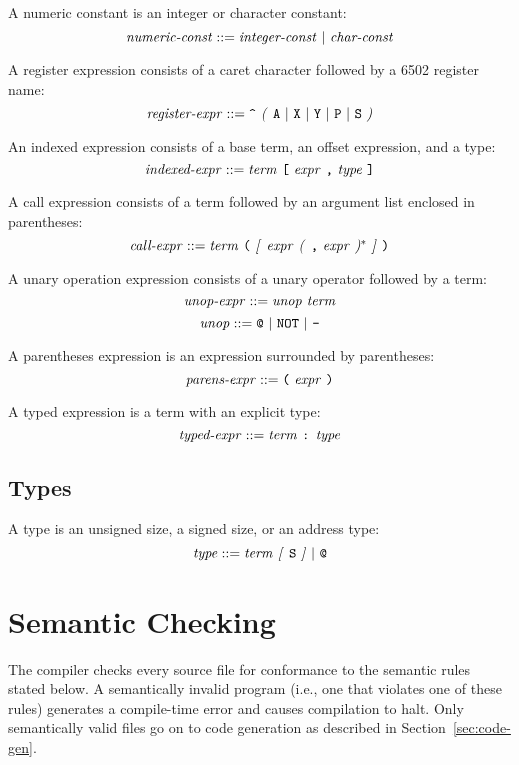 \documentclass[10pt]{article}
\begin{document}
  A numeric constant is an integer or
character constant:
%
$$\mbox{\textit{numeric-const}} ::= \mbox{\ensuremath{\mbox{\textit{integer-const}}} $|$
  \ensuremath{\mbox{\textit{char-const}}}}$$

 A register expression consists of a
caret character followed by a 6502 register name:
%
$$\mbox{\textit{register-expr}} ::= \mbox{\texttt{\textasciicircum} \textit{(} \texttt{A} $|$
    \texttt{X} $|$ \texttt{Y} $|$ \texttt{P} $|$ \texttt{S} \textit{)}}$$

 An indexed expression consists of a base
term, an offset expression, and a type:
%
$$\mbox{\textit{indexed-expr}} ::= \mbox{\ensuremath{\mbox{\textit{term}}} \texttt{[}
    \ensuremath{\mbox{\textit{expr}}} \texttt{,} \ensuremath{\mbox{\textit{type}}} \texttt{]}}$$

 A call expression consists of a term
followed by an argument list enclosed in parentheses:
%
$$\mbox{\textit{call-expr}} ::= \mbox{\ensuremath{\mbox{\textit{term}}} \texttt{(}
  \textit{[} \ensuremath{\mbox{\textit{expr}}} \textit{(} \texttt{,} \ensuremath{\mbox{\textit{expr}}} \textit{)}$^*$ \textit{]} \texttt{)}}$$

 A unary operation expression
consists of a unary operator followed by a term:
%
$$\mbox{\textit{unop-expr}} ::= \mbox{\ensuremath{\mbox{\textit{unop}}} \ensuremath{\mbox{\textit{term}}}}$$
%
$$\mbox{\textit{unop}} ::= \mbox{\texttt{@} $|$ \texttt{NOT} $|$ \texttt{-}}$$

 A parentheses expression is an
expression surrounded by parentheses:
%
$$\mbox{\textit{parens-expr}} ::= \mbox{\texttt{(} \ensuremath{\mbox{\textit{expr}}} \texttt{)}}$$

 A typed expression is a term with an
explicit type:
%
$$\mbox{\textit{typed-expr}} ::= \mbox{\ensuremath{\mbox{\textit{term}}} \texttt{:}
  \ensuremath{\mbox{\textit{type}}}}$$

\subsection{Types}
\label{sec:syntax:types}

A type is an unsigned size, a signed size, or an address type:
%
$$\mbox{\textit{type}} ::= \mbox{\ensuremath{\mbox{\textit{term}}} \textit{[} \texttt{S} \textit{]} $|$ \texttt{@}}$$

\section{Semantic Checking}
\label{sec:semantics}

The compiler checks every source file for conformance to the semantic
rules stated below.  A semantically invalid program (i.e., one that
violates one of these rules) generates a compile-time error and causes
compilation to halt.  Only semantically valid files go on to code
generation as described in Section~\ref{sec:code-gen}.
\end{document}
